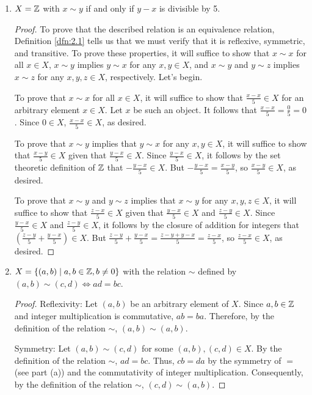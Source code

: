 \documentclass[../main.tex]{subfiles}
\begin{document}
\begin{exercise}
\begin{enumerate}[label={\alph*)},ref={\theexercise\alph*}]
\begin{proof}
        \end{proof}
        \item \label{exr:2.2d}$X=\mathbb{Z}$ with $x\sim y$ if and only if $y-x$ is divisible by 5.
        \begin{proof}
            To prove that the described relation is an equivalence relation, Definition \ref{dfn:2.1} tells us that we must verify that it is reflexive, symmetric, and transitive. To prove these properties, it will suffice to show that $x\sim x$ for all $x\in X$, $x\sim y$ implies $y\sim x$ for any $x,y\in X$, and $x\sim y$ and $y\sim z$ implies $x\sim z$ for any $x,y,z\in X$, respectively. Let's begin.\par
            To prove that $x\sim x$ for all $x\in X$, it will suffice to show that $\frac{x-x}{5}\in X$ for an arbitrary element $x\in X$. Let $x$ be such an object. It follows that $\frac{x-x}{5}=\frac{0}{5}=0$. Since $0\in X$, $\frac{x-x}{5}\in X$, as desired.\par
            To prove that $x\sim y$ implies that $y\sim x$ for any $x,y\in X$, it will suffice to show that $\frac{x-y}{5}\in X$ given that $\frac{y-x}{5}\in X$. Since $\frac{y-x}{5}\in X$, it follows by the set theoretic definition of $\mathbb{Z}$ that $-\frac{y-x}{5}\in X$. But $-\frac{y-x}{5}=\frac{x-y}{5}$, so $\frac{x-y}{5}\in X$, as desired.\par
            To prove that $x\sim y$ and $y\sim z$ implies that $x\sim y$ for any $x,y,z\in X$, it will suffice to show that $\frac{z-x}{5}\in X$ given that $\frac{y-x}{5}\in X$ and $\frac{z-y}{5}\in X$. Since $\frac{y-x}{5}\in X$ and $\frac{z-y}{5}\in X$, it follows by the closure of addition for integers that $\left( \frac{z-y}{5}+\frac{y-x}{5} \right)\in X$. But $\frac{z-y}{5}+\frac{y-x}{5}=\frac{z-y+y-x}{5}=\frac{z-x}{5}$, so $\frac{z-x}{5}\in X$, as desired.
        \end{proof}
        \item \label{exr:2.2e}$X=\{(a,b)\mid a,b\in\mathbb{Z},b\neq 0\}$ with the relation $\sim$ defined by $(a,b)\sim(c,d)\Longleftrightarrow ad=bc$.
        \begin{proof}
            Reflexivity: Let $(a,b)$ be an arbitrary element of $X$. Since $a,b\in\mathbb{Z}$ and integer multiplication is commutative, $ab=ba$. Therefore, by the definition of the relation $\sim$, $(a,b)\sim(a,b)$.\par
            Symmetry: Let $(a,b)\sim(c,d)$ for some $(a,b),(c,d)\in X$. By the definition of the relation $\sim$, $ad=bc$. Thus, $cb=da$ by the symmetry of $=$ (see part (a)) and the commutativity of integer multiplication. Consequently, by the definition of the relation $\sim$, $(c,d)\sim(a,b)$.\par

\end{proof}
\end{enumerate}
\end{exercise}
\end{document}
